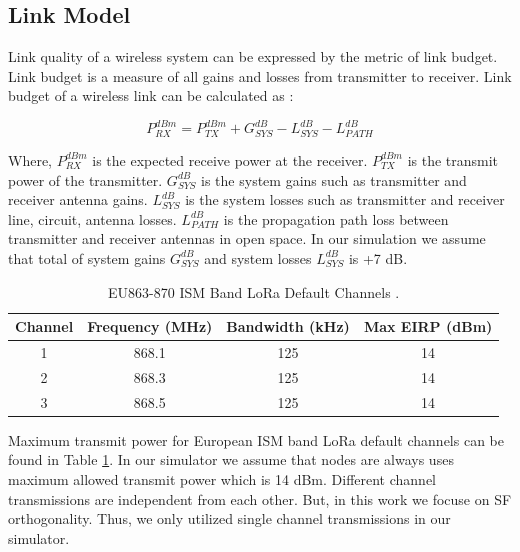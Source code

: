 \documentclass[conference]{IEEEtran}
\begin{document}
\subsection{Link Model}
\par Link quality of a wireless system can be expressed by the metric of link budget. Link budget is a measure of all gains and losses from transmitter to receiver. Link budget of a wireless link can be calculated as \cite{AN1200.22}:

\begin{equation} \label{eq:expected_rx_power}
P^{dBm}_{RX} = P^{dBm}_{TX} + G^{dB}_{SYS} - L^{dB}_{SYS} - L^{dB}_{PATH}
\end{equation}

\par Where, $P^{dBm}_{RX}$ is the expected receive power at the receiver. $P^{dBm}_{TX}$ is the transmit power of the transmitter. $G^{dB}_{SYS}$ is the system gains such as transmitter and receiver antenna gains. $L^{dB}_{SYS}$ is the system losses such as transmitter and receiver line, circuit, antenna losses. $L^{dB}_{PATH}$ is the propagation path loss between transmitter and receiver antennas in open space. In our simulation we assume that total of system gains $G^{dB}_{SYS}$ and system losses $L^{dB}_{SYS}$ is +7 dB.

\begin{table}
\centering
\caption{EU863-870 ISM Band LoRa Default Channels \cite{lorawan.regional.parameters}.}
\label{table:max_tx_power}
\begin{tabular}{|c|c|c|c|}
\hline
\textbf{Channel} & \textbf{Frequency (MHz)} & \textbf{Bandwidth (kHz)} & \textbf{Max EIRP (dBm)} \\ \hline
      1 &     868.1 &   125 &   14 \\ \hline
      2 &     868.3 &   125 &   14 \\ \hline
      3 &     868.5 &   125 &   14 \\

\hline
\end{tabular}
\end{table}

\par Maximum transmit power for European ISM band LoRa default channels can be found in Table \ref{table:max_tx_power}. In our simulator we assume that nodes are always uses maximum allowed transmit power which is 14 dBm. Different channel transmissions are independent from each other. But, in this work we focuse on SF orthogonality. Thus, we only utilized single channel transmissions in our simulator.
\end{document}
